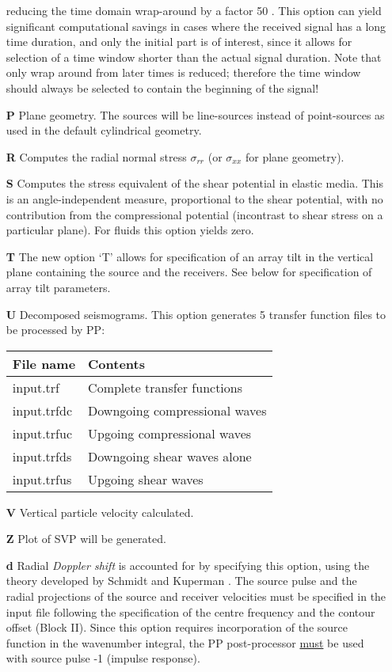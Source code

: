 \begin{itemize}
      reducing the time domain wrap-around by a factor 50
      \cite{jkps}. This option can yield significant computational
      savings in cases where the received signal has a long time
      duration, and only the initial part is of interest, since it
      allows for selection of a time window shorter than the actual
      signal duration. Note that only wrap around from later times is
      reduced; therefore the time window should always be selected to
      contain the beginning of the signal!  
\item[{\bf P}] Plane
      geometry. The sources will be line-sources instead of
      point-sources as used in the default cylindrical geometry.
\item[{\bf R}] Computes the radial normal stress $\sigma_{rr}$
      (or $\sigma_{xx}$ for plane geometry).  \item[{\bf S}] Computes
      the stress equivalent of the shear potential in elastic
      media. This is an angle-independent measure, proportional to the
      shear potential, with no contribution from the compressional
      potential (incontrast to shear stress on a particular plane).
      For fluids this option yields zero.  
\item[{\bf T}] The new
      option `T' allows for specification of an array tilt in the
      vertical plane containing the source and the receivers.  See
      below for specification of array tilt parameters.  
\item[{\bf U}] Decomposed seismograms.  This option generates 5 transfer
      function files to be processed by PP:

          \begin{tabular}{ll}
          File name & Contents \\ \hline
          input.trf &     Complete transfer functions \\
          input.trfdc &    Downgoing compressional waves \\
          input.trfuc  &  Upgoing compressional waves  \\
          input.trfds  &  Downgoing  shear waves alone \\
          input.trfus &    Upgoing shear waves
          \end{tabular}
\item[{\bf V}] Vertical particle velocity calculated.
\item[{\bf Z}] Plot of SVP will be generated.

\item[{\bf d}] Radial {\em Doppler shift} is accounted for by
specifying  this option, using the theory developed by Schmidt and Kuperman
\cite{sk:jasa94}.  The source pulse and the radial projections of the
source and  receiver velocities must be specified in the input file
following the specification of the centre frequency and the contour
offset (Block II). Since this option requires incorporation of the
source function in the wavenumber integral, the PP post-processor
\underline{must} be used with source pulse -1 (impulse response).


\end{itemize}
